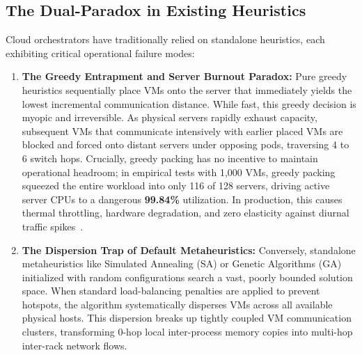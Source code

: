 \documentclass[conference]{IEEEtran}
\begin{document}
\subsection{The Dual-Paradox in Existing Heuristics}
Cloud orchestrators have traditionally relied on standalone heuristics, each exhibiting critical operational failure modes:
\begin{enumerate}
    \item \textbf{The Greedy Entrapment and Server Burnout Paradox:} Pure greedy heuristics sequentially place VMs onto the server that immediately yields the lowest incremental communication distance. While fast, this greedy decision is myopic and irreversible. As physical servers rapidly exhaust capacity, subsequent VMs that communicate intensively with earlier placed VMs are blocked and forced onto distant servers under opposing pods, traversing 4 to 6 switch hops. Crucially, greedy packing has no incentive to maintain operational headroom; in empirical tests with 1,000 VMs, greedy packing squeezed the entire workload into only 116 of 128 servers, driving active server CPUs to a dangerous \textbf{99.84\%} utilization. In production, this causes thermal throttling, hardware degradation, and zero elasticity against diurnal traffic spikes~\cite{baryannis2019supply}.
    \item \textbf{The Dispersion Trap of Default Metaheuristics:} Conversely, standalone metaheuristics like Simulated Annealing (SA) or Genetic Algorithms (GA) initialized with random configurations search a vast, poorly bounded solution space. When standard load-balancing penalties are applied to prevent hotspots, the algorithm systematically disperses VMs across all available physical hosts. This dispersion breaks up tightly coupled VM communication clusters, transforming 0-hop local inter-process memory copies into multi-hop inter-rack network flows.
\end{enumerate}
\end{document}
